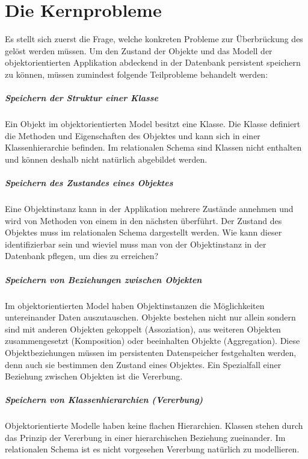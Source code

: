 \chapter{Die Kernprobleme}

Es stellt sich zuerst die Frage, welche konkreten Probleme zur Überbrückung des  gelöst werden müssen. Um den Zustand der Objekte und das Modell der objektorientierten Applikation abdeckend in der Datenbank persistent speichern zu können, müssen zumindest folgende Teilprobleme behandelt werden:
\paragraph{Speichern der Struktur einer Klasse}
Ein Objekt im objektorientierten Model besitzt eine Klasse. Die Klasse definiert die Methoden und Eigenschaften des Objektes und kann sich in einer Klassenhierarchie befinden. Im relationalen Schema sind Klassen nicht enthalten und können deshalb nicht natürlich abgebildet werden.

\paragraph{Speichern des Zustandes eines Objektes}
Eine Objektinstanz kann in der Applikation mehrere Zustände annehmen und wird von Methoden von einem in den nächsten überführt. Der Zustand des Objektes muss im relationalen Schema dargestellt werden. Wie kann dieser identifizierbar sein und wieviel muss man von der Objektinstanz in der Datenbank pflegen, um dies zu erreichen?

\paragraph{Speichern von Beziehungen zwischen Objekten}
Im objektorientierten Model haben Objektinstanzen die Möglichkeiten untereinander Daten auszutauschen. Objekte bestehen nicht nur allein sondern sind mit anderen Objekten gekoppelt (Assoziation), aus weiteren Objekten zusammengesetzt (Komposition) oder beeinhalten Objekte (Aggregation). Diese Objektbeziehungen müssen im persistenten Datenspeicher festgehalten werden, denn auch sie bestimmen den Zustand eines Objektes. Ein Spezialfall einer Beziehung zwischen Objekten ist die Vererbung.

\paragraph{Speichern von Klassenhierarchien (Vererbung)}
Objektorientierte Modelle haben keine flachen Hierarchien. Klassen stehen durch das Prinzip der Vererbung in einer hierarchischen Beziehung zueinander. Im relationalen Schema ist es nicht vorgesehen Vererbung natürlich zu modellieren.

